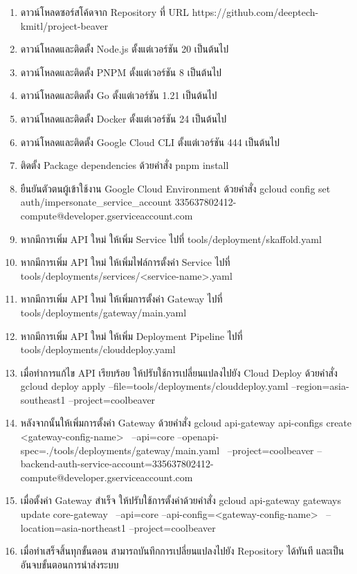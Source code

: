 \begin{enumerate}
	\item ดาวน์โหลดซอร์สโค้ดจาก Repository ที่ URL https://github.com/deeptech-kmitl/project-beaver
	\item ดาวน์โหลดและติดตั้ง Node.js ตั้งแต่เวอร์ชัน 20 เป็นต้นไป
	\item ดาวน์โหลดและติดตั้ง PNPM ตั้งแต่เวอร์ชัน 8 เป็นต้นไป
	\item ดาวน์โหลดและติดตั้ง Go ตั้งแต่เวอร์ชัน 1.21 เป็นต้นไป
	\item ดาวน์โหลดและติดตั้ง Docker ตั้งแต่เวอร์ชัน 24 เป็นต้นไป
	\item ดาวน์โหลดและติดตั้ง Google Cloud CLI ตั้งแต่เวอร์ชัน 444 เป็นต้นไป
	\item ติดตั้ง Package dependencies ด้วยคำสั่ง pnpm install
	\item ยืนยันตัวตนผู้เข้าใช้งาน Google Cloud Environment ด้วยคำสั่ง gcloud config set auth/impersonate\_service\_account 335637802412-compute@developer.gserviceaccount.com
	\item หากมีการเพิ่ม API ใหม่ ให้เพิ่ม Service ไปที่ tools/deployment/skaffold.yaml
	\item หากมีการเพิ่ม API ใหม่ ให้เพิ่มไฟล์การตั้งค่า Service ไปที่ tools/deployments/services/<service-name>.yaml
	\item หากมีการเพิ่ม API ใหม่ ให้เพิ่มการตั้งค่า Gateway ไปที่ tools/deployments/gateway/main.yaml
	\item หากมีการเพิ่ม API ใหม่ ให้เพิ่ม Deployment Pipeline ไปที่ tools/deployments/clouddeploy.yaml
	\item เมื่อทำการแก้ไข API เรียบร้อย ให้ปรับใช้การเปลี่ยนแปลงไปยัง Cloud Deploy ด้วยคำสั่ง gcloud deploy apply --file=tools/deployments/clouddeploy.yaml --region=asia-southeast1 --project=coolbeaver
	\item หลังจากนั้นให้เพิ่มการตั้งค่า Gateway ด้วยคำสั่ง gcloud api-gateway api-configs create <gateway-config-name> \
      --api=core --openapi-spec=./tools/deployments/gateway/main.yaml \
      --project=coolbeaver --backend-auth-service-account=335637802412-compute@developer.gserviceaccount.com
	\item เมื่อตั้งค่า Gateway สำเร็จ ให้ปรับใช้การตั้งค่าด้วยคำสั่ง gcloud api-gateway gateways update core-gateway \
      --api=core --api-config=<gateway-config-name> \
      --location=asia-northeast1 --project=coolbeaver
	\item เมื่อทำเสร็จสิ้นทุกขั้นตอน สามารถบันทึกการเปลี่ยนแปลงไปยัง Repository ได้ทันที และเป็นอันจบขั้นตอนการนำส่งระบบ
\end{enumerate}

